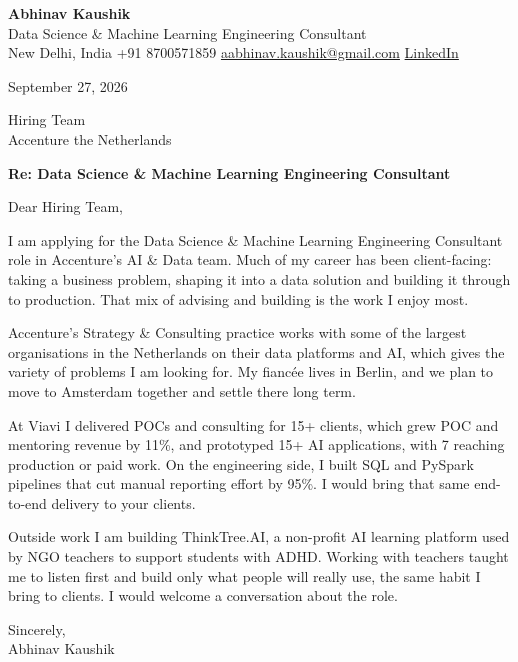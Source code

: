 \documentclass[11pt,a4paper]{article}
\begin{document}
{\Large\bfseries Abhinav Kaushik}\\
Data Science \& Machine Learning Engineering Consultant\\
New Delhi, India \textbar{} +91 8700571859 \textbar{} \href{mailto:aabhinav.kaushik@gmail.com}{aabhinav.kaushik@gmail.com} \textbar{} \href{https://www.linkedin.com/in/abhinav-kaushik10/}{LinkedIn}  

September 27, 2026

Hiring Team\\
Accenture the Netherlands

\textbf{Re: Data Science \& Machine Learning Engineering Consultant}

Dear Hiring Team,

I am applying for the Data Science \& Machine Learning Engineering Consultant role in Accenture's AI \& Data team. Much of my career has been client-facing: taking a business problem, shaping it into a data solution and building it through to production. That mix of advising and building is the work I enjoy most.

Accenture's Strategy \& Consulting practice works with some of the largest organisations in the Netherlands on their data platforms and AI, which gives the variety of problems I am looking for. My fiancée lives in Berlin, and we plan to move to Amsterdam together and settle there long term.

At Viavi I delivered POCs and consulting for 15+ clients, which grew POC and mentoring revenue by 11\%, and prototyped 15+ AI applications, with 7 reaching production or paid work. On the engineering side, I built SQL and PySpark pipelines that cut manual reporting effort by 95\%. I would bring that same end-to-end delivery to your clients.

Outside work I am building ThinkTree.AI, a non-profit AI learning platform used by NGO teachers to support students with ADHD. Working with teachers taught me to listen first and build only what people will really use, the same habit I bring to clients. I would welcome a conversation about the role.

Sincerely,\\[4pt]
Abhinav Kaushik
\end{document}
